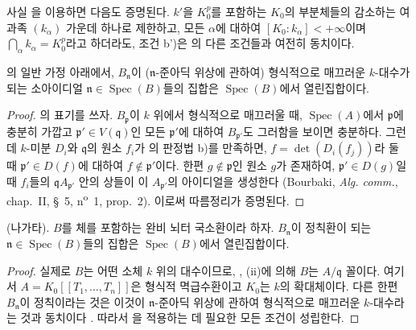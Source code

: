 
\begin{remark}[22.7.4]
\label{0.22.7.4-ko}
사실 을 이용하면 다음도 증명된다. $k'$을
$K_0^p$를 포함하는 $K_0$의 부분체들의 감소하는 여과족
$(k_\alpha)$ 가운데 하나로 제한하고, 모든 $\alpha$에 대하여
$[K_0:k_\alpha]<+\infty$이며
$\bigcap_\alpha k_\alpha=K_0^p$라고 하더라도, 조건 b')은
의 다른 조건들과 여전히 동치이다.
\end{remark}

\begin{corollary}[22.7.5]
\label{0.22.7.5-ko}
의 일반 가정 아래에서, $B_{\mathfrak n}$이
($\mathfrak n$-준아딕 위상에 관하여) 형식적으로 매끄러운
$k$-대수가 되는 소아이디얼
$\mathfrak n\in\operatorname{Spec}(B)$들의 집합은
$\operatorname{Spec}(B)$에서 열린집합이다.
\end{corollary}

\begin{proof}
의 표기를 쓰자. $B_{\mathfrak p}$이 $k$ 위에서
형식적으로 매끄러울 때, $\operatorname{Spec}(A)$에서
$\mathfrak p$에 충분히 가깝고 $\mathfrak p'\in V(\mathfrak q)$인
모든 $\mathfrak p'$에 대하여 $B_{\mathfrak p'}$도 그러함을 보이면
충분하다. 그런데 $k$-미분 $D_i$와 $\mathfrak q$의 원소 $f_i$가
의 판정법 b)를 만족하면,
$f=\det(D_i(f_j))$라 둘 때 $\mathfrak p'\in D(f)$에 대하여
$f\notin\mathfrak p'$이다. 한편 $g\notin\mathfrak p$인 원소 $g$가
존재하여, $\mathfrak p'\in D(g)$일 때 $f_i$들의
$\mathfrak qA_{\mathfrak p'}$ 안의 상들이 이 $A_{\mathfrak p'}$의
아이디얼을 생성한다 (Bourbaki, \emph{Alg. comm.}, chap.~II, §~5,
n\textsuperscript{o}~1, prop.~2). 이로써 따름정리가 증명된다.
\end{proof}

\begin{corollary}[22.7.6]
\label{0.22.7.6-ko}
\textnormal{(나가타).} $B$를 체를 포함하는 완비 뇌터 국소환이라 하자.
$B_{\mathfrak n}$이 정칙환이 되는
$\mathfrak n\in\operatorname{Spec}(B)$들의 집합은
$\operatorname{Spec}(B)$에서 열린집합이다.
\end{corollary}

\begin{proof}
실제로 $B$는 어떤 소체 $k$ 위의 대수이므로, ,
(ii)에 의해 $B$는 $A/\mathfrak q$ 꼴이다. 여기서
$A=K_0[[T_1,\ldots,T_n]]$은 형식적 멱급수환이고 $K_0$는 $k$의
확대체이다. 다른 한편 $B_{\mathfrak n}$이 정칙이라는 것은 이것이
$\mathfrak n$-준아딕 위상에 관하여 형식적으로 매끄러운
$k$-대수라는 것과 동치이다 . 따라서
을 적용하는 데 필요한 모든 조건이 성립한다.
\end{proof}

